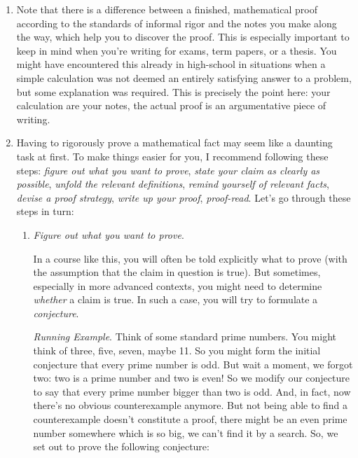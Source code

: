 \begin{enumerate}[{\thesection}.1]
	 \item Note that there is a difference between a finished, mathematical proof according to the standards of informal rigor and the notes you make along the way, which help you to discover the proof. This is especially important to keep in mind when you're writing for exams, term papers, or a thesis. You might have encountered this already in high-school in situations when a simple calculation was not deemed an entirely satisfying answer to a problem, but some explanation was required. This is precisely the point here: your calculation are your notes, the actual proof is an argumentative piece of writing. 
	 
	 \item Having to rigorously prove a mathematical fact may seem like a daunting task at first. To make things easier for you, I recommend following these steps:  \emph{figure out what you want to prove}, \emph{state your claim as clearly as possible}, \emph{unfold the relevant definitions}, \emph{remind yourself of relevant facts}, \emph{devise a proof strategy}, \emph{write up your proof}, \emph{proof-read}. Let's go through these steps in turn:

	 
	 	\begin{enumerate}[\thesection.{7}.1]
		
			\item \emph{Figure out what you want to prove}.
							
				In a course like this, you will often be told explicitly what to prove (with the assumption that the claim in question is true). But sometimes, especially in more advanced contexts, you might need to determine \emph{whether} a claim is true. In such a case, you will try to formulate a \emph{conjecture}.
				
				\vspace{2ex}
				
				\emph{Running Example}. Think of some standard prime numbers. You might think of three, five, seven, maybe 11. So you might form the initial conjecture that every prime number is odd. But wait a moment, we forgot two: two is a prime number and two is even! So we modify our conjecture to say that every prime number bigger than two is odd. And, in fact, now there's no obvious counterexample anymore. But not being able to find a counterexample doesn't constitute a proof, there might be an even prime number somewhere which is so big, we can't find it by a search. So, we set out to prove the following conjecture:
				

\end{enumerate}
\end{enumerate}
